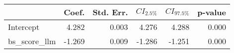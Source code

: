 \begin{tabular}{lrrrrr}
\toprule
 & Coef. & Std. Err. & $CI_{2.5\%}$ & $CI_{97.5\%}$ & p-value \\
\midrule
Intercept & 4.282 & 0.003 & 4.276 & 4.288 & 0.000 \\
bs_score_llm & -1.269 & 0.009 & -1.286 & -1.251 & 0.000 \\
\bottomrule
\end{tabular}
